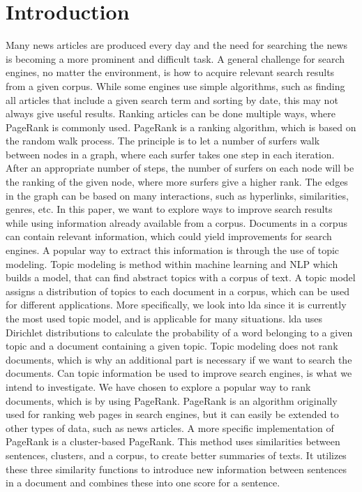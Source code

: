 \section{Introduction} 

Many news articles are produced every day and the need for searching the news is becoming a more prominent and difficult task.
A general challenge for search engines, no matter the environment, is how to acquire relevant search results from a given corpus. 
While some engines use simple algorithms, such as finding all articles that include a given search term and sorting by date, this may not always give useful results.
Ranking articles can be done multiple ways, where PageRank is commonly used\cite{google_pagerank2006}.
PageRank\cite{pagerank_1999} is a ranking algorithm, which is based on the random walk process.
The principle is to let a number of surfers walk between nodes in a graph, where each surfer takes one step in each iteration.
After an appropriate number of steps, the number of surfers on each node will be the ranking of the given node, where more surfers give a higher rank.
The edges in the graph can be based on many interactions, such as hyperlinks, similarities, genres, etc.
In this paper, we want to explore ways to improve search results while using information already available from a corpus.
Documents in a corpus can contain relevant information, which could yield improvements for search engines.
A popular way to extract this information is through the use of topic modeling.
Topic modeling is method within machine learning and \gls{NLP} which builds a model, that can find abstract topics with a corpus of text.
A topic model assigns a distribution of topics to each document in a corpus, which can be used for different applications.
More specifically, we look into \gls{lda} since it is currently the most used topic model, and is applicable for many situations\cite{lda}.
\gls{lda} uses Dirichlet distributions to calculate the probability of a word belonging to a given topic and a document containing a given topic.
Topic modeling does not rank documents, which is why an additional part is necessary if we want to search the documents.
Can topic information be used to improve search engines, is what we intend to investigate.
We have chosen to explore a popular way to rank documents, which is by using PageRank.
PageRank is an algorithm originally used for ranking web pages in search engines, but it can easily be extended to other types of data, such as news articles.
A more specific implementation of PageRank is a cluster-based PageRank\cite{ClusterPageRank}.
This method uses similarities between sentences, clusters, and a corpus, to create better summaries of texts.
It utilizes these three similarity functions to introduce new information between sentences in a document and combines these into one score for a sentence.

